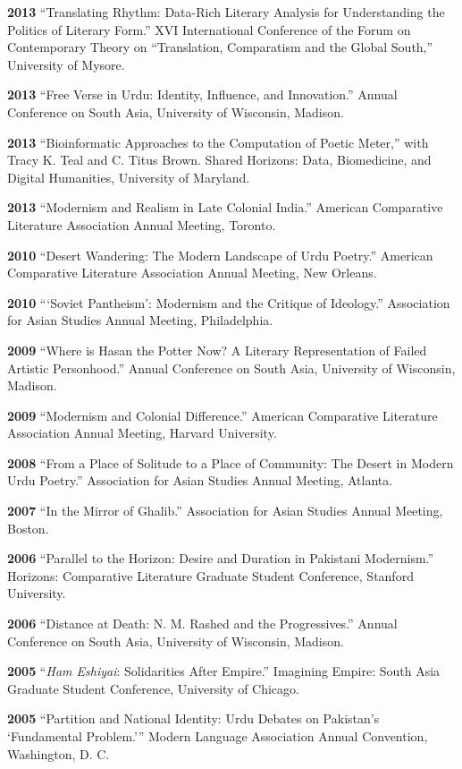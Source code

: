 \documentclass[letterpaper,12pt]{article}
\begin{document}
\textbf{2013}
“Translating Rhythm:
Data-Rich Literary Analysis for Understanding the Politics of Literary Form.”
XVI International Conference of the Forum on Contemporary Theory on
“Translation, Comparatism and the Global South,” University of Mysore.

\textbf{2013}
“Free Verse in Urdu: Identity, Influence, and Innovation.”
Annual Conference on South Asia, University of Wisconsin, Madison.

\textbf{2013}
“Bioinformatic Approaches to the Computation of Poetic Meter,”
with Tracy K. Teal and C. Titus Brown.
Shared Horizons: Data, Biomedicine, and Digital Humanities, University of Maryland.

\textbf{2013}
“Modernism and Realism in Late Colonial India.”
American Comparative Literature Association Annual Meeting, Toronto.

\textbf{2010}
“Desert Wandering: The Modern Landscape of Urdu Poetry.”
American Comparative Literature Association Annual Meeting, New Orleans.

\textbf{2010}
“‘Soviet Pantheism’: Modernism and the Critique of Ideology.”
Association for Asian Studies Annual Meeting, Philadelphia.

\textbf{2009}
“Where is Hasan the Potter Now? A Literary Representation of Failed Artistic Personhood.”
Annual Conference on South Asia, University of Wisconsin, Madison.

\textbf{2009}
“Modernism and Colonial Difference.”
American Comparative Literature Association Annual Meeting, Harvard University.

\textbf{2008}
“From a Place of Solitude to a Place of Community: The Desert in Modern Urdu Poetry.”
Association for Asian Studies Annual Meeting, Atlanta.

\textbf{2007}
“In the Mirror of Ghalib.”
Association for Asian Studies Annual Meeting, Boston.

\textbf{2006}
“Parallel to the Horizon: Desire and Duration in Pakistani Modernism.”
Horizons: Comparative Literature Graduate Student Conference, Stanford University.

\textbf{2006}
“Distance at Death: N. M. Rashed and the Progressives.”
Annual Conference on South Asia, University of Wisconsin, Madison.

\textbf{2005}
“\emph{Ham Eshiyai}: Solidarities After Empire.”
Imagining Empire: South Asia Graduate Student Conference, University of Chicago.

\textbf{2005}
“Partition and National Identity: Urdu Debates on Pakistan’s ‘Fundamental Problem.’”
Modern Language Association Annual Convention, Washington, D. C.
\end{document}

